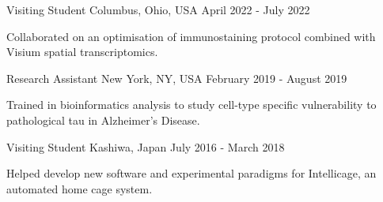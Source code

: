 %
%
%

\vspace*{0.4cm}

\begin{cventries}

    {Visiting Student}
    {Columbus, Ohio, USA}
    {April 2022 - July 2022}
    {\begin{cvitems}
        \item Collaborated on an optimisation of immunostaining protocol combined with Visium spatial transcriptomics.
    \end{cvitems}\vspace{1.5\baselineskip}}

    \vspace*{0.2cm}

    {Research Assistant}
    {New York, NY, USA}
    {February 2019 - August 2019}
    {\begin{cvitems}
        \item Trained in bioinformatics analysis to study cell-type specific vulnerability to pathological tau in Alzheimer's Disease.
    \end{cvitems}\vspace{1.5\baselineskip}}

    \vspace*{0.2cm}

    {Visiting Student}
    {Kashiwa, Japan}
    {July 2016 - March 2018}
    {\begin{cvitems}
        \item Helped develop new software and experimental paradigms for Intellicage, an automated home cage system.
    \end{cvitems}\vspace{1.5\baselineskip}}


\end{cventries}
